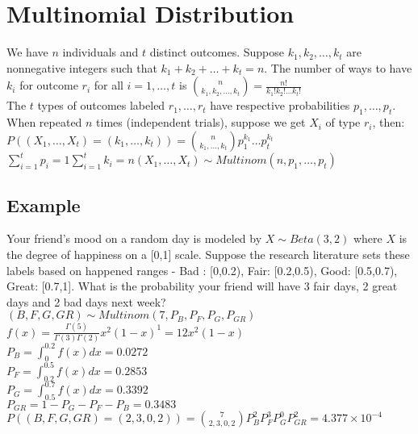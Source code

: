 \documentclass{article}
\begin{document}
\section{Multinomial Distribution}
\label{sec:multinom}
We have $n$ individuals and $t$ distinct outcomes. Suppose $k_1,k_2,\dots,k_t$ are nonnegative integers such that $k_1+k_2+\dots+k_t=n$. The number of ways to have $k_i$ for outcome $r_i$ for all $i=1,\dots,t$ is $\binom{n}{k_1,k_2,\dots,k_t}=\frac{n!}{k_1!k_2!\dots k_t!}$\\
\newline
The $t$ types of outcomes labeled $r_1,\dots,r_t$ have respective probabilities $p_1,\dots,p_t$. When repeated $n$ times (independent trials), suppose we get $X_i$ of type $r_i$, then:\\
$P((X_1,\dots,X_t)=(k_1,\dots,k_t))=\binom{n}{k_1,\dots,k_t}p_1^{k_1}\dots p_t^{k_t}$\\
$\sum_{i=1}^tp_i=1$\hspace*{0.25in}$\sum_{i=1}^tk_i=n$\hspace*{0.25in}$(X_1,\dots,X_t)\sim Multinom(n,p_1,\dots,p_t)$
\subsection{Example}
Your friend’s mood on a random day is modeled by $X\sim Beta(3,2)$ where $X$
is the degree of happiness on a [0,1] scale. Suppose the research literature
sets these labels based on happened ranges - Bad : [0,0.2), Fair: [0.2,0.5),
Good: [0.5,0.7), Great: [0.7,1]. What is the probability your friend will
have 3 fair days, 2 great days and 2 bad days next week?\\
$(B,F,G,GR)\sim Multinom(7,P_B,P_F,P_G,P_{GR})$\\
$f(x)=\frac{\Gamma(5)}{\Gamma(3)\Gamma(2)}x^2(1-x)^1=12x^2(1-x)$\\
$P_B=\int_0^{0.2}f(x)dx=0.0272$\\
$P_F=\int_{0.2}^{0.5}f(x)dx=0.2853$\\
$P_G=\int_{0.5}^{0.7}f(x)dx=0.3392$\\
$P_{GR}=1-P_G-P_F-P_B=0.3483$\\
$P((B,F,G,GR)=(2,3,0,2))=\binom{7}{2,3,0,2}P_B^2P_F^3P_G^0P_{GR}^2=4.377\times10^{-4}$
\end{document}
